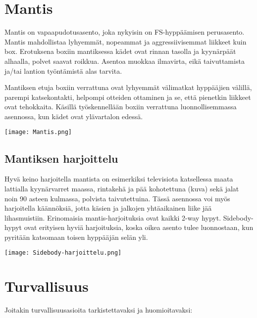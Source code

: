 \section{ Mantis }
\label{fs-hyppaamisen-perusteet-mantis}


Mantis on vapaapudotusasento, joka nykyisin on FS-hyppäämisen perusasento. Mantis mahdollistaa lyhyemmät, nopeammat ja aggressiivisemmat liikkeet kuin box. Erotuksena boxiin mantiksessa kädet ovat rinnan tasolla ja kyynärpäät alhaalla, polvet saavat roikkua. Asentoa muokkaa ilmavirta, eikä taivuttamista ja/tai lantion työntämistä alas tarvita. 


Mantiksen etuja boxiin verrattuna ovat lyhyemmät välimatkat hyppääjien välillä, parempi katsekontakti, helpompi otteiden ottaminen ja se, että pienetkin liikkeet ovat tehokkaita. Käsillä työskennellään boxiin verrattuna luonnollisemmassa asennossa, kun kädet ovat ylävartalon edessä. 


\begin{Figure}\centering\texttt{[image: Mantis.png]}\end{Figure} 

\subsection{ Mantiksen harjoittelu }
\label{fs-hyppaamisen-perusteet-mantiksen-harjoittelu}


Hyvä keino harjoitella mantista on esimerkiksi televisiota katsellessa maata lattialla kyynärvarret maassa, rintakehä ja pää kohotettuna (kuva) sekä jalat noin 90 asteen kulmassa, polvista taivutettuina. Tässä asennossa voi myös harjoitella käännöksiä, jotta käsien ja jalkojen yhtäaikainen liike jää lihasmuistiin. Erinomaisia mantis-harjoituksia ovat kaikki 2-way hypyt. Sidebody-hypyt ovat erityisen hyviä harjoituksia, koska oikea asento tulee luonnostaan, kun pyritään katsomaan toisen hyppääjän selän yli. 


\begin{Figure}\centering\texttt{[image: Sidebody-harjoittelu.png]}\end{Figure} 

\section{ Turvallisuus }
\label{fs-hyppaamisen-perusteet-turvallisuus}


Joitakin turvallisuusasioita tarkistettavaksi ja huomioitavaksi: 


